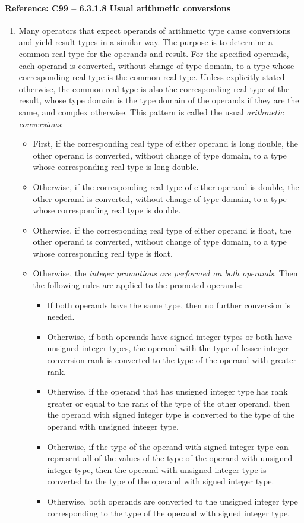 \documentclass[11pt]{article}
\begin{document}
\paragraph{Reference: C99 -- 6.3.1.8  Usual arithmetic conversions}
\begin{enumerate}
\item  Many operators that expect operands of arithmetic type cause conversions and 
yield result types in a similar way. The purpose is to determine a common 
real type for the operands and result. For the specified operands, each 
operand is converted, without change of type domain, to a type whose 
corresponding real type is the common real type. Unless explicitly stated 
otherwise, the common real type is also the corresponding real type of the 
result, whose type domain is the type domain of the operands if they are 
the same, and complex otherwise. This pattern is called the usual 
\emph{arithmetic conversions}:
\begin{itemize}
\item 
First, if the corresponding real type of either operand is long double, 
the other operand is converted, without change of type domain, to a 
type whose corresponding real type is long double.
\item Otherwise, if the corresponding real type of either operand is double, 
the other operand is converted, without change of type domain, to a type 
whose corresponding real type is double.
\item Otherwise, if the corresponding real type of either operand is float, 
the other operand is converted, without change of type domain, to a 
type whose corresponding real type is float.
\item
Otherwise, the \emph{integer promotions are performed on both operands}. 
Then the following rules are applied to the promoted operands:
\begin{itemize}
\item If both operands have the same type, then no further conversion is needed.
\item Otherwise, if both operands have signed integer types or both have 
unsigned integer types, the operand with the type of lesser integer conversion 
rank is converted to the type of the operand with greater rank.
\item Otherwise, if the operand that has unsigned integer type has rank 
greater or equal to the rank of the type of the other operand, then 
the operand with signed integer type is converted to the type of 
the operand with unsigned integer type.
\item Otherwise, if the type of the operand with signed integer type 
can represent all of the values of the type of the operand with unsigned 
integer type, then the operand with unsigned integer type is converted 
to the type of the operand with signed integer type.
\item Otherwise, both operands are converted to the unsigned integer 
type corresponding to the type of the operand with signed integer type.
\end{itemize}
\end{itemize}
\end{enumerate}
\end{document}
